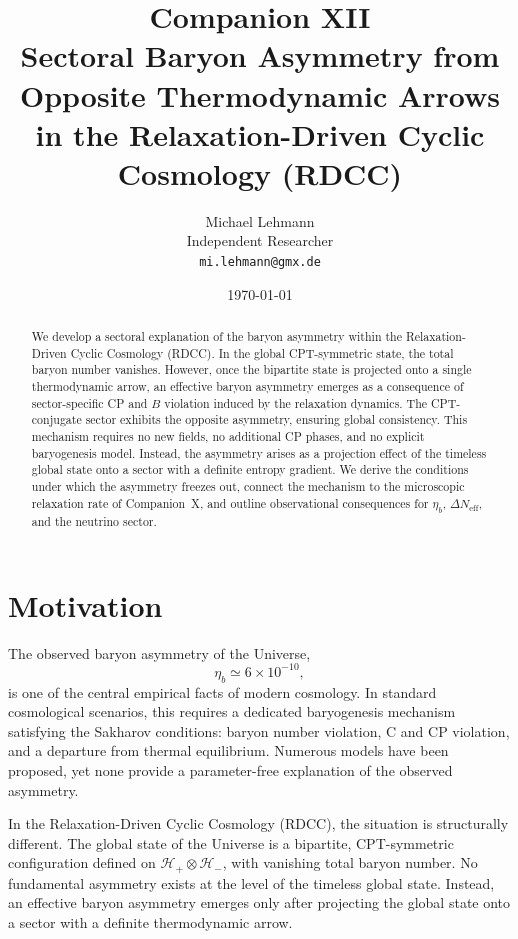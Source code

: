 \documentclass[11pt,a4paper]{article}
\title{%
  \textbf{Companion XII}\\[8pt]
  {\Large Sectoral Baryon Asymmetry from Opposite Thermodynamic Arrows}\\[4pt]
  {\Large in the Relaxation-Driven Cyclic Cosmology (RDCC)}
}
\author{Michael Lehmann\\
Independent Researcher\\
\texttt{mi.lehmann@gmx.de}}
\date{\today}
\newcommand{\Hglobal}{\mathcal{H}_{+}\!\otimes\!\mathcal{H}_{-}}
\begin{document}
\maketitle

\begin{abstract}
We develop a sectoral explanation of the baryon asymmetry within the Relaxation-Driven Cyclic Cosmology (RDCC). In the global CPT-symmetric state, the total baryon number vanishes. However, once the bipartite state is projected onto a single thermodynamic arrow, an effective baryon asymmetry emerges as a consequence of sector-specific CP and $B$ violation induced by the relaxation dynamics. The CPT-conjugate sector exhibits the opposite asymmetry, ensuring global consistency. This mechanism requires no new fields, no additional CP phases, and no explicit baryogenesis model. Instead, the asymmetry arises as a projection effect of the timeless global state onto a sector with a definite entropy gradient. We derive the conditions under which the asymmetry freezes out, connect the mechanism to the microscopic relaxation rate of Companion~X, and outline observational consequences for $\eta_b$, $\Delta N_{\mathrm{eff}}$, and the neutrino sector.
\end{abstract}


\section{Motivation}

The observed baryon asymmetry of the Universe,
\begin{equation}
\eta_b \simeq 6 \times 10^{-10},
\end{equation}
is one of the central empirical facts of modern cosmology. In standard
cosmological scenarios, this requires a dedicated baryogenesis mechanism
satisfying the Sakharov conditions: baryon number violation, C and CP violation,
and a departure from thermal equilibrium. Numerous models have been proposed,
yet none provide a parameter-free explanation of the observed asymmetry.

In the Relaxation-Driven Cyclic Cosmology (RDCC), the situation is
structurally different. The global state of the Universe is a bipartite,
CPT-symmetric configuration defined on $\Hglobal$, with vanishing total baryon
number. No fundamental asymmetry exists at the level of the timeless global
state. Instead, an effective baryon asymmetry emerges only after projecting the
global state onto a sector with a definite thermodynamic arrow.
\end{document}
